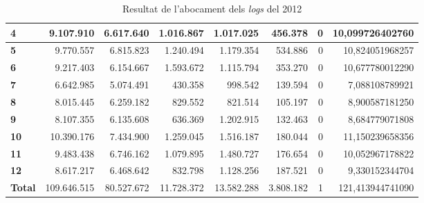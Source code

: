\begin{table}[h!]
\begin{adjustbox}{width=1.5\textwidth, center}
\begin{tabular}{|l|r|r|r|r|r|r|r|}
            \textbf{4}     & 9.107.910   & 6.617.640  & 1.016.867  & 1.017.025  & 456.378   & 0 & 10,099726402760  \\
            \midrule
            \textbf{5}     & 9.770.557   & 6.815.823  & 1.240.494  & 1.179.354  & 534.886   & 0 & 10,824051968257  \\
            \textbf{6}     & 9.217.403   & 6.154.667  & 1.593.672  & 1.115.794  & 353.270   & 0 & 10,677780012290  \\
            \textbf{7}     & 6.642.985   & 5.074.491  & 430.358    & 998.542    & 139.594   & 0 & 7,088108789921   \\
            \textbf{8}     & 8.015.445   & 6.259.182  & 829.552    & 821.514    & 105.197   & 0 & 8,900587181250   \\
            \midrule
            \textbf{9}     & 8.107.355   & 6.135.608  & 636.369    & 1.202.915  & 132.463   & 0 & 8,684779071808   \\
            \textbf{10}    & 10.390.176  & 7.434.900  & 1.259.045  & 1.516.187  & 180.044   & 0 & 11,150239658356  \\
            \textbf{11}    & 9.483.438   & 6.746.162  & 1.079.895  & 1.480.727  & 176.654   & 0 & 10,052967178822  \\
            \textbf{12}    & 8.617.217   & 6.468.642  & 832.798    & 1.128.256  & 187.521   & 0 & 9,330152344704   \\
            \midrule
            \textbf{Total} & 109.646.515 & 80.527.672 & 11.728.372 & 13.582.288 & 3.808.182 & 1 & 121,413944741090 \\
            \bottomrule
        \end{tabular}
    \end{adjustbox}
    \caption{Resultat de l'abocament dels \textit{logs} del 2012}
    \label{tab:logs-table-2012}
\end{table}
